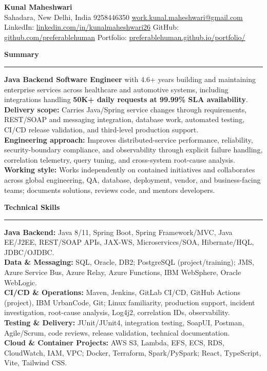 \documentclass[11pt,letterpaper]{article}
\newcommand{\ressection}[1]{\Needspace{6\baselineskip}\vspace{8pt}\par\textbf{#1}\par\vspace{2pt}\hrule\vspace{5pt}}
\begin{document}
\pagestyle{empty}\raggedright\fontsize{11}{12.5}\selectfont

{\Large \textbf{Kunal Maheshwari}}\\
Sahadara, New Delhi, India \textbar{} 9258446350 \textbar{} \href{mailto:work.kunal.maheshwari@gmail.com}{work.kunal.maheshwari@gmail.com}\\
LinkedIn: \href{https://www.linkedin.com/in/kunalmaheshwari26}{linkedin.com/in/kunalmaheshwari26} \textbar{} GitHub: \href{https://github.com/preferablehuman}{github.com/preferablehuman} \textbar{} Portfolio: \href{https://preferablehuman.github.io/portfolio/}{preferablehuman.github.io/portfolio/}

\ressection{Summary}
\textbf{Java Backend Software Engineer} with 4.6+ years building and maintaining enterprise services across healthcare and automotive systems, including integrations handling \textbf{50K+ daily requests at 99.99\% SLA availability}.\\[2pt]
\textbf{Delivery scope:} Carries Java/Spring service changes through requirements, REST/SOAP and messaging integration, database work, automated testing, CI/CD release validation, and third-level production support.\\[2pt]
\textbf{Engineering approach:} Improves distributed-service performance, reliability, security-boundary compliance, and observability through explicit failure handling, correlation telemetry, query tuning, and cross-system root-cause analysis.\\[2pt]
\textbf{Working style:} Works independently on contained initiatives and collaborates across global engineering, QA, database, deployment, vendor, and business-facing teams; documents solutions, reviews code, and mentors developers.

\ressection{Technical Skills}
\textbf{Java Backend:} Java 8/11, Spring Boot, Spring Framework/MVC, Java EE/J2EE, REST/SOAP APIs, JAX-WS, Microservices/SOA, Hibernate/HQL, JDBC/OJDBC.\\
\textbf{Data \& Messaging:} SQL, Oracle, DB2; PostgreSQL (project/training); JMS, Azure Service Bus, Azure Relay, Azure Functions, IBM WebSphere, Oracle WebLogic.\\
\textbf{CI/CD \& Operations:} Maven, Jenkins, GitLab CI/CD, GitHub Actions (project), IBM UrbanCode, Git; Linux familiarity, production support, incident investigation, root-cause analysis, Log4j2, correlation IDs, observability.\\
\textbf{Testing \& Delivery:} JUnit/JUnit4, integration testing, SoapUI, Postman, Agile/Scrum, code reviews, release validation, technical documentation.\\
\textbf{Cloud \& Container Projects:} AWS S3, Lambda, EFS, ECS, RDS, CloudWatch, IAM, VPC; Docker, Terraform, Spark/PySpark; React, TypeScript, Vite, Tailwind CSS.
\end{document}

